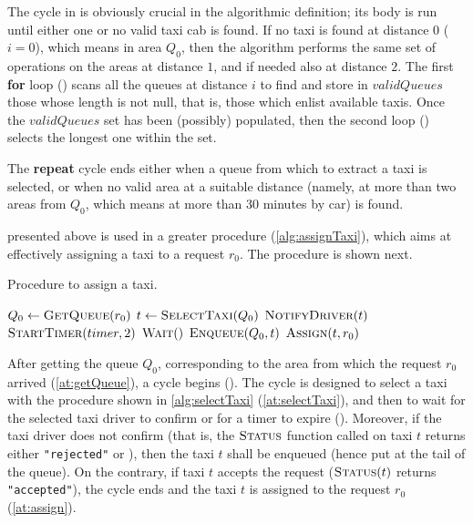 The cycle in  is obviously crucial in the algorithmic definition; its body is run until either one or no valid taxi cab is found. If no taxi is found at distance $0$ ($i=0$), which means in area $Q_0$, then the algorithm performs the same set of operations on the areas at distance $1$, and if needed also at distance $2$. The first \textbf{for} loop () scans all the queues at distance $i$ to find and store in $validQueues$ those whose length is not null, that is, those which enlist available taxis. Once the $validQueues$ set has been (possibly) populated, then the second loop () selects the longest one within the set.

The \textbf{repeat} cycle ends either when a queue from which to extract a taxi is selected, or when no valid area at a suitable distance (namely, at more than two areas from $Q_0$, which means at more than \num{30} minutes by car) is found.

 presented above is used in a greater procedure (\cref{alg:assignTaxi}), which aims at effectively assigning a taxi to a request $r_0$. The procedure is shown next.




\begin{algorithm}
\caption{Procedure to assign a taxi.} \label{alg:assignTaxi}
\begin{algorithmic}[1]
	\State $Q_0 \gets \Call{GetQueue}{r_0}$ \label{at:getQueue}
	\Repeat \label{at:repeat}
		\State $t \gets \Call{\GetTaxi}{Q_0}$ \label{at:selectTaxi}
		\State $\Call{NotifyDriver}{t}$ \label{at:notifyDriver}
		\State $\Call{StartTimer}{timer,2}$ \label{at:startTimer}
			\State $\Call{Wait}{\nullfont}$
		\EndWhile \label{at:endWhile}
			\State $\Call{Enqueue}{Q_0,t}$
		\EndIf
	 \label{at:until}
	\State $\Call{Assign}{t,r_0}$ \label{at:assign}
\EndProcedure
\end{algorithmic}
\end{algorithm}


After getting the queue $Q_0$, corresponding to the area from which the request $r_0$ arrived (\cref{at:getQueue}), a cycle begins (). The cycle is designed to select a taxi with the procedure shown in \cref{alg:selectTaxi} (\cref{at:selectTaxi}), and then to wait for the selected taxi driver to confirm or for a timer to expire (). Moreover, if the taxi driver does not confirm (that is, the $\Call{Status}{}$ function called on taxi $t$ returns either \texttt{"rejected"} or \aNull), then the taxi $t$ shall be enqueued (hence put at the tail of the queue). On the contrary, if taxi $t$ accepts the request ($\Call{Status}{t}$ returns \texttt{"accepted"}), the cycle ends and the taxi $t$ is assigned to the request $r_0$ (\cref{at:assign}).

